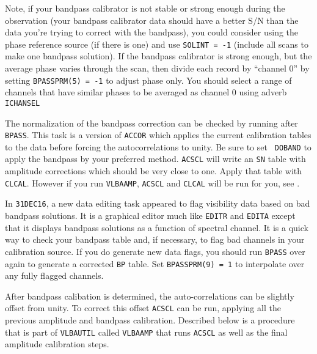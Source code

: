 Note, if your bandpass calibrator is not stable or strong enough
during the observation (your bandpass calibrator data should have
a better S/N than the data you're trying to correct with the
bandpass), you could consider using the phase reference source (if
there is one) and use {\tt SOLINT = -1} (include all scans to make one
bandpass solution).  If the bandpass calibrator is strong enough, but
the average phase varies through the scan, then divide each record by
``channel 0'' by setting {\tt BPASSPRM(5) = -1} to adjust phase only.
You should select a range of channels that have similar phases to be
averaged as channel 0 using adverb {\tt ICHANSEL}\@

The normalization of the bandpass correction can be checked by running
{\tt {}} after {\tt BPASS}\@.  This task is a version of
{\tt ACCOR} which applies the current calibration tables to the data
before forcing the autocorrelations to unity.  Be sure to set {\tt
DOBAND} to apply the bandpass by your preferred method.  {\tt ACSCL}
will write an {\tt SN} table with amplitude corrections which should
be very close to one.  Apply that table with {\tt CLCAL}\@.  However
if you run {\tt VLBAAMP}, {\tt ACSCL} and {\tt CLCAL} will be run
for you, see \@.

In {\tt 31DEC16}, a new data editing task {\tt {}} appeared
to flag visibility data based on bad bandpass solutions.  It is a
graphical editor much like {\tt EDITR} and {\tt EDITA} except that it
displays bandpass solutions as a function of spectral channel.  It is
a quick way to check your bandpass table and, if necessary, to flag
bad channels in your calibration source.  If you do generate new data
flags, you should run {\tt BPASS} over again to generate a corrected
{\tt BP} table.  Set {\tt BPASSPRM(9) = 1} to interpolate over any
fully flagged channels.



After bandpass calibation is determined, the auto-correlations can be
slightly offset from unity.  To correct this offset {\tt ACSCL} can be run,
applying all the previous amplitude and bandpass calibration.  Described
below is a procedure that is part of {\tt VLBAUTIL} called {\tt VLBAAMP}
that runs {\tt ACSCL} as well as the final amplitude calibration steps.

